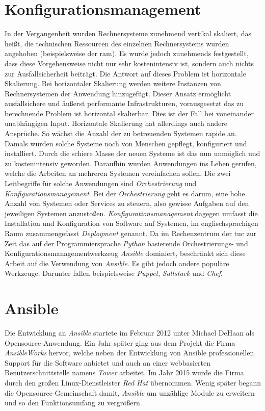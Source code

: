 \documentclass[titlepage]{report}
\begin{document}
\section{Konfigurationsmanagement}
In der Vergangenheit wurden Rechnersysteme zunehmend vertikal skaliert,
das heißt, die technischen Ressourcen des einzelnen Rechnersystems wurden angehoben
(beispielsweise der \gls{ram}). Es wurde jedoch zunehmends
festgestellt, dass diese Vorgehensweise nicht nur sehr kostenintensiv
ist, sondern auch nichts zur Ausfallsicherheit beiträgt. Die
Antwort auf dieses Problem ist horizontale Skalierung. Bei horizontaler
Skalierung werden weitere Instanzen von Rechnersystemen der Anwendung
hinzugefügt. Dieser Ansatz ermöglicht ausfallsichere und äußerst performante
Infrastrukturen, vorausgesetzt das zu berechnende Problem ist horizontal
skalierbar. Dies ist der Fall bei voneinander unabhängigen Input. Horizontale
Skalierung hat allerdings auch andere Ansprüche. So wächst die Anzahl der zu
betreuenden Systemen rapide an.  Damals wurden solche Systeme noch von Menschen
gepflegt, konfiguriert und installiert. Durch die schiere Masse der neuen
Systeme ist das nun unmöglich und zu kostenintensiv geworden.  Daraufhin wurden
Anwendungen ins Leben gerufen, welche die Arbeiten an mehreren Systemen
vereinfachen sollen. Die zwei Leitbegriffe für solche Anwendungen sind
\emph{Orchestrierung} und \emph{Konfigurationsmanagement}. Bei der
\emph{Orchestrierung} geht es darum, eine hohe Anzahl von Systemen oder Services zu steuern,
also gewisse Aufgaben auf den jeweiligen Systemen anzustoßen.
\emph{Konfigurationsmanagement} dagegen umfasst die Installation und
Konfiguration von Software auf Systemen, im englischsprachigen Raum zusammengefasst
\emph{Deployment} genannt. Da im Rechenzentrum der \gls{tuc} zur Zeit das auf
der Programmiersprache \emph{Python} basierende Orchestrierungs\hyp{} und
Konfigurationsmanagementwerkzeug \emph{Ansible} dominiert, beschränkt sich diese
Arbeit auf die Verwendung von \emph{Ansible}. Es gibt jedoch andere populäre
Werkzeuge. Darunter fallen beispielsweise \emph{Puppet}, \emph{Saltstack} und
\emph{Chef}.
\section{Ansible}
Die Entwicklung an \emph{Ansible} startete im Februar 2012 unter Michael
DeHaan als Opensource\hyp{}Anwendung\cite{ANSIBLE_ORIGINS}. Ein Jahr
später ging aus dem Projekt die Firma \emph{AnsibleWorks} hervor, welche
neben der Entwicklung von Ansible professionellen Support für die
Software anbietet und auch an einer webbasierten Benutzerschnittstelle
namens \emph{Tower} arbeitet\cite{ANSIBLEWORKS}. Im Jahr 2015 wurde die
Firma durch den großen Linux\hyp{}Dienstleister \emph{Red Hat}
übernommen\cite{ANSIBLEREDHAT}. Wenig später begann die
Opensource\hyp{}Gemeinschaft damit, \emph{Ansible} um unzählige Module zu
erweitern und so den Funktionsumfang zu vergrößern.
\end{document}
